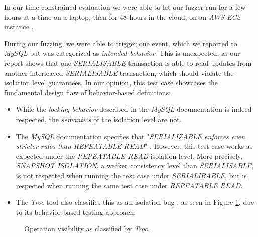 In our time-constrained evaluation we were able to let our fuzzer run for a few hours at a time on a laptop, then for 48 hours in the cloud, on an \textit{AWS EC2} instance \cite{awswebpage}.

During our fuzzing, we were able to trigger one event, which we reported to \textit{MySQL} but was categorized as \textit{intended behavior}. This is unexpected, as our report shows that one \textit{SERIALISABLE} transaction is able to read updates from another interleaved \textit{SERIALISABLE} transaction, which should violate the isolation level guarantees. In our opinion, this test case showcases the fundamental design flaw of behavior-based definitions:
\begin{itemize}
    \item While the \textit{locking behavior} described in the \textit{MySQL} documentation is indeed respected, the \textit{semantics} of the isolation level are not.
    \item The \textit{MySQL} documentation specifies that "\textit{SERIALIZABLE enforces even stricter rules than REPEATABLE READ}" \cite{mysqlisolationlevels}. However, this test case works as expected under the \textit{REPEATABLE READ} isolation level. More precisely, \textit{SNAPSHOT ISOLATION}, a weaker consistency level than \textit{SERIALISABLE}, is not respected when running the test case under \textit{SERIALIBABLE}, but is respected when running the same test case under \textit{REPEATABLE READ}.
    \item The \textit{Troc} tool also classifies this as an isolation bug \cite{dou2023detecting_ICSE2023}, as seen in Figure \ref{fig:trocclassification}, due to its behavior-based testing approach. 
\end{itemize}


\begin{figure}[!h]
    \centering
    \caption{Operation visibility as classified by \textit{Troc}.}
    \label{fig:trocclassification}
\end{figure}


